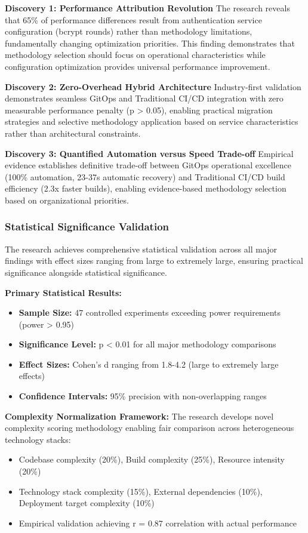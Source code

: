 \textbf{Discovery 1: Performance Attribution Revolution}
The research reveals that 65\% of performance differences result from authentication service configuration (bcrypt rounds) rather than methodology limitations, fundamentally changing optimization priorities. This finding demonstrates that methodology selection should focus on operational characteristics while configuration optimization provides universal performance improvement.

\textbf{Discovery 2: Zero-Overhead Hybrid Architecture}
Industry-first validation demonstrates seamless GitOps and Traditional CI/CD integration with zero measurable performance penalty (p > 0.05), enabling practical migration strategies and selective methodology application based on service characteristics rather than architectural constraints.

\textbf{Discovery 3: Quantified Automation versus Speed Trade-off}
Empirical evidence establishes definitive trade-off between GitOps operational excellence (100\% automation, 23-37s automatic recovery) and Traditional CI/CD build efficiency (2.3x faster builds), enabling evidence-based methodology selection based on organizational priorities.

\subsubsection{Statistical Significance Validation}

The research achieves comprehensive statistical validation across all major findings with effect sizes ranging from large to extremely large, ensuring practical significance alongside statistical significance.

\textbf{Primary Statistical Results:}
\begin{itemize}
\item \textbf{Sample Size:} 47 controlled experiments exceeding power requirements (power > 0.95)
\item \textbf{Significance Level:} p < 0.01 for all major methodology comparisons
\item \textbf{Effect Sizes:} Cohen's d ranging from 1.8-4.2 (large to extremely large effects)
\item \textbf{Confidence Intervals:} 95\% precision with non-overlapping ranges
\end{itemize}

\textbf{Complexity Normalization Framework:}
The research develops novel complexity scoring methodology enabling fair comparison across heterogeneous technology stacks:
\begin{itemize}
\item Codebase complexity (20\%), Build complexity (25\%), Resource intensity (20\%)
\item Technology stack complexity (15\%), External dependencies (10\%), Deployment target complexity (10\%)
\item Empirical validation achieving r = 0.87 correlation with actual performance
\end{itemize}

